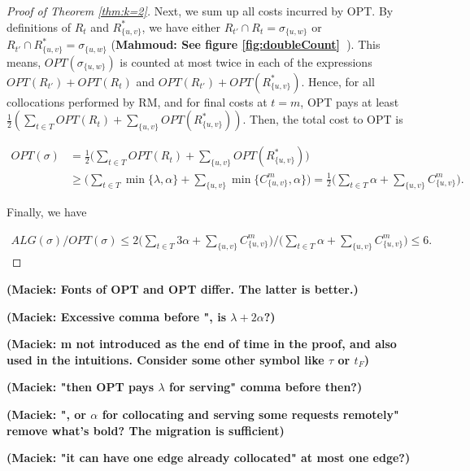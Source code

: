 \documentclass[a4paper,anonymous,USenglish]{lipics-v2019}
\newcommand{\OPT}{\textsc{OPT}\xspace}
\newcommand{\OPTM}{\mathit{OPT}}
\newcommand{\RM}{\textsc{RM}\xspace} %
\newcommand\mahmoud[1]{\color{orange}\textbf{Mahmoud: #1~}\color{black}}
\newcommand\maciek[1]{\color{brown}\textbf{(Maciek: #1)}\color{black}}
\begin{document}
\begin{proof}[Proof of Theorem \ref{thm:k=2}]
	Next, we sum up all costs incurred by \OPT.
	By definitions of $R_t$ and $R^*_{\{u,v\}}$, we have either
	$R_{t'} \cap R_t = \sigma_{\{u,w\}}$ or
	$R_{t'} \cap R^*_{\{u,v\}} = \sigma_{\{u,w\}}$
	(\mahmoud{See figure \ref{fig:doubleCount}}). 
	This means,
	$\OPTM ( \sigma_{\{u,w\}})$
	is counted at most twice in each of  the expressions
	$\mathit{OPT} (R_{t'}) + \mathit{OPT} (R_t)$
	and  
	$\mathit{OPT} (R_{t'}) + \mathit{OPT} (R^*_{\{u,v\}})$.
	Hence,
	for all collocations performed by \RM,
	and for final costs at $t=m$,
	\OPT pays at least 
	$\frac{1}{2}(
	\sum_{ t \in T } \mathit{OPT} (R_t) +
	\sum_{\{u,v\}} \mathit{OPT} (R^*_{\{u,v\}})
	) $.
	Then,
	the total cost to \OPT is
	
	\begin{align*} 	%
		\mathit{OPT} (\sigma)
		&=
		\frac{1}{2}
		\Big(
		\sum_{ t \in T} \mathit{OPT} (R_t) 
		+ \sum_{\{u,v\}}\mathit{OPT} (R^*_{\{u,v\}})
		\Big)	\\
		&\geq
		\Big(
		\sum_{ t \in T} \min{ \{ \lambda, \alpha \}}  +
		\sum_{\{u,v\}} \min{ \{C^{m}_{\{u,v\}} , \alpha \} } 
		\Big)		
		=
		\frac{1}{2}		
		\Big(
		\sum_{ t \in T} \alpha  
		+ \sum_{\{u,v\}} C^{m}_{\{u,v\}}
		\Big).
	\end{align*}

Finally, we have

\begin{align*}
	\mathit{ALG} (\sigma)	/
	\mathit{OPT} (\sigma)
	\leq
	2\Big(
	\sum_{ t \in T} 3\alpha +
	\sum_{\{u,v\}} C^{m}_{\{u,v\}}
	\Big)	 \big /
	\Big(
	\sum_{ t \in T} \alpha  
	+ \sum_{\{u,v\}} C^{m}_{\{u,v\}}  
	\Big)	\leq 6.
\end{align*}

\end{proof}
\maciek{Fonts of OPT and \OPT differ. The latter is better.}

\maciek{Excessive comma before ", is $\lambda +2\alpha$?}

\maciek{m not introduced as the end of time in the proof, and also used in the intuitions. Consider some other symbol like $\tau$ or $t_F$}

\maciek{"then \OPT pays $\lambda$ for serving" comma before then?}

\maciek{", or $\alpha$ for collocating \textbf{and serving some requests remotely}" remove what's bold? The migration is sufficient}

\maciek{"it can have one edge already collocated" at most one edge?}
\end{document}
